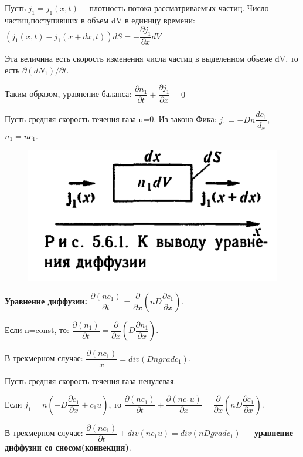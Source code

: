 Пусть $j_1=j_1(x,t)$--- плотность потока рассматриваемых частиц. Число частиц,поступивших в объем dV в единицу времени: $(j_1(x,t)-j_1(x+dx,t))dS=-\dfrac{\partial j_1}{\partial x}dV$ 

Эта величина есть скорость изменения числа частиц в выделенном объеме dV, то есть 
$\partial(dN_1)/\partial t$.

Таким образом, уравнение баланса: \hspace{1 cm} $\dfrac{\partial n_1}{\partial t}+\dfrac{\partial j_1}{\partial x}=0$

Пусть средняя скорость течения газа u=0. Из закона Фика: $j_1=-Dn\dfrac{dc_1}{d_x}$, $n_1=nc_1$.

\begin{figure} 
	\vspace{-5ex}
	\includegraphics[width=\linewidth]{urdif}
	
	
\end{figure}

\textbf{Уравнение диффузии:} \hspace{1 cm} $\dfrac{\partial(nc_1)}{\partial t}=\dfrac{\partial}{\partial x}\left(nD\dfrac{\partial c_1}{\partial x}\right)$.

Если n=const, то: $\dfrac{\partial(n_1)}{\partial t}=\dfrac{\partial}{\partial x}\left(D\dfrac{\partial n_1}{\partial x}\right)$.

В трехмерном случае: $\dfrac{\partial(nc_1)}{x}=div(D n gradc_1)$.

Пусть средняя скорость течения газа ненулевая.

Если $j_1=n\left(-D\dfrac{\partial c_1}{\partial x}+c_1u\right)$, то $\dfrac{\partial(nc_1)}{\partial t}+\dfrac{\partial(nc_1u)}{\partial x}=\dfrac{\partial}{\partial x}\left(nD\dfrac{\partial c_1}{\partial x}\right)$.

В трехмерном случае: $\dfrac{\partial(nc_1)}{\partial t}+div(nc_1u)=div(nDgradc_1)$ --- \textbf{уравнение диффузии со сносом(конвекция)}.

